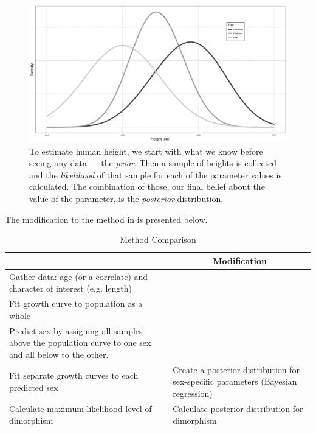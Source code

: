 \documentclass[letterpaper]{article}
\begin{document}
\begin{figure}[H]
	\centering
	\includegraphics[width = \textwidth]{images/bayesianExample.png}
	\caption{To estimate human height, we start with what we know before seeing any data --- the \emph{prior}. Then a sample of heights is collected and the \emph{likelihood} of that sample for each of the parameter values is calculated. The combination of those, our final belief about the value of the parameter, is the \emph{posterior} distribution.}
	\label{fig:bayesianExplanation}
\end{figure}

The modification to the method in \cite{saittaEffectSizeStatistical2020} is presented below.

\begin{table}[H]
    \centering
    \caption{Method Comparison}
    \begin{tabularx}{\textwidth}{XX}
        \toprule
        \multicolumn{1}{c}{\cite{saittaEffectSizeStatistical2020}} & \multicolumn{1}{c}{Modification} \\
        \midrule
        Gather data: age (or a correlate) and character of interest (e.g. length) & \\
        Fit growth curve to population as a whole & \\
        Predict sex by assigning all samples above the population curve to one sex and all below to the other. & \\
        Fit separate growth curves to each predicted sex & Create a posterior distribution for sex-specific parameters (Bayesian regression) \\
        Calculate maximum likelihood level of dimorphism & Calculate posterior distribution for dimorphism \\
        \bottomrule
    \end{tabularx}
\end{table}
\end{document}
